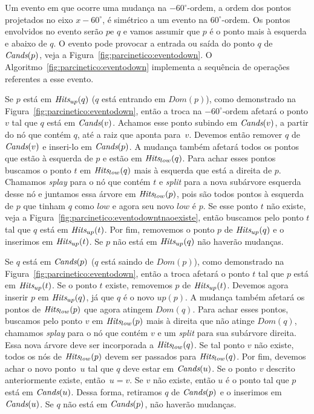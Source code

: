 



Um evento em que ocorre uma mudança na $-60^\circ$-ordem, a ordem dos pontos projetados no eixo $x -
60^\circ$, é simétrico a um evento na $60^\circ$-ordem.
Os pontos envolvidos no evento serão $p$e $q$ e vamos assumir que $p$ é o ponto mais à esquerda e
abaixo de $q$.
O evento pode provocar a entrada ou saída do ponto $q$ de $\textit{Cands}(p)$, veja a
Figura~\ref{fig:parcinetico:eventodown}.
O Algoritmo~\ref{fig:parcinetico:eventodown} implementa a sequência de operações referentes a esse
evento.

Se $p$ está em $\textit{Hits}_{up}(q)$ ($q$ está entrando em $Dom(p)$), como demonstrado na
Figura~\ref{fig:parcinetico:eventodown}, então a troca na $-60^\circ$-ordem afetará o ponto $v$ tal
que $q$ está em $\textit{Cands}(v)$.
Achamos esse ponto subindo em $\textit{Cands}(v)$, a partir do nó que contém $q$, até a raiz que aponta
para~$v$.
Devemos então remover $q$ de $\textit{Cands}(v)$ e inseri-lo em $\textit{Cands}(p)$.
A mudança também afetará todos os pontos que estão à esquerda de $p$ e estão em $\textit{Hits}_{low}(q)$.
Para achar esses pontos buscamos o ponto $t$ em $\textit{Hits}_{low}(q)$ mais à esquerda que está a
direita de $p$.
Chamamos \textit{splay} para o nó que contém $t$ e \textit{split} para a nova subárvore esquerda
desse nó e juntamos essa árvore em $\textit{Hits}_{low}(p)$, pois são todos pontos à esquerda de $p$ que
tinham $q$ como $low$ e agora seu novo $low$ é $p$.
Se esse ponto $t$ não existe, veja a Figura~\ref{fig:parcinetico:eventodowntnaoexiste}, então
buscamos pelo ponto $t$ tal que $q$ está em $\textit{Hits}_{up}(t)$.
Por fim, removemos o ponto $p$ de $\textit{Hits}_{up}(q)$ e o inserimos em $\textit{Hits}_{up}(t)$.
Se $p$ não está em $\textit{Hits}_{up}(q)$ não haverão mudanças.

Se $q$ está em $\textit{Cands}(p)$ ($q$ está saindo de $Dom(p)$), como demonstrado na
Figura~\ref{fig:parcinetico:eventodown}, então a troca afetará o ponto $t$ tal que $p$ está em
$\textit{Hits}_{up}(t)$.
Se o ponto $t$ existe, removemos $p$ de $\textit{Hits}_{up}(t)$.
Devemos agora inserir $p$ em $\textit{Hits}_{up}(q)$, já que $q$ é o novo $up(p)$.
A mudança também afetará os pontos de $\textit{Hits}_{low}(p)$ que agora atingem $Dom(q)$.
Para achar esses pontos, buscamos pelo ponto $v$ em $\textit{Hits}_{low}(p)$ mais à direita que não atinge
$Dom(q)$, chamamos \textit{splay} para o nó que contém $v$ e um \textit{split} para sua subárvore
direita.
Essa nova árvore deve ser incorporada a $\textit{Hits}_{low}(q)$.
Se tal ponto $v$ não existe, todos os nós de $\textit{Hits}_{low}(p)$ devem ser passados para $\textit{Hits}_{low}
(q)$.
Por fim, devemos achar o novo ponto~$u$ tal que $q$ deve estar em $\textit{Cands}(u)$.
Se o ponto $v$ descrito anteriormente existe, então~$u = v$.
Se $v$ não existe, então $u$ é o ponto tal que $p$ está em $\textit{Cands}(u)$.
Dessa forma, retiramos $q$ de $\textit{Cands}(p)$ e o inserimos em $\textit{Cands}(u)$.
Se $q$ não está em $\textit{Cands}(p)$, não haverão mudanças.

